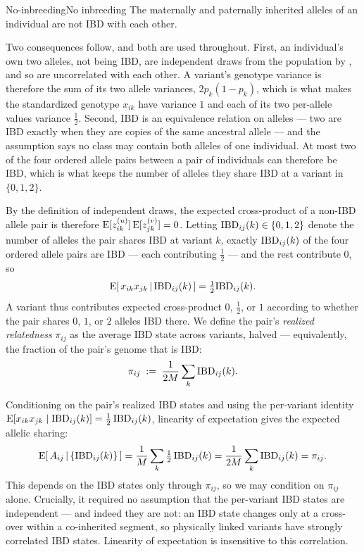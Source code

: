 \documentclass[12pt]{article}
\begin{document}
\begin{assumption}{No-inbreeding}{No inbreeding}
The maternally and paternally inherited alleles of an individual are not IBD with each other.
\end{assumption}

Two consequences follow, and both are used throughout.
First, an individual's own two alleles, not being IBD, are independent draws from the population by , and so are uncorrelated with each other.
A variant's genotype variance is therefore the sum of its two allele variances, $2p_k(1-p_k)$, which is what makes the standardized genotype $x_{ik}$ have variance $1$ and each of its two per-allele values variance $\tfrac12$.
Second, IBD is an equivalence relation on alleles --- two are IBD exactly when they are copies of the same ancestral allele --- and the assumption says no class may contain both alleles of one individual.
At most two of the four ordered allele pairs between a pair of individuals can therefore be IBD, which is what keeps the number of alleles they share IBD at a variant in $\{0,1,2\}$.

By the definition of independent draws, the expected cross-product of a non-IBD allele pair is therefore $\mathrm{E}[z^{(u)}_{ik}]\,\mathrm{E}[z^{(v)}_{jk}] = 0$.
Letting $\mathrm{IBD}_{ij}(k)\in\{0,1,2\}$ denote the number of alleles the pair shares IBD at variant $k$, exactly $\mathrm{IBD}_{ij}(k)$ of the four ordered allele pairs are IBD --- each contributing $\tfrac12$ --- and the rest contribute $0$, so
$$
    \mathrm{E}\!\left[\,x_{ik} x_{jk} \,\middle|\, \mathrm{IBD}_{ij}(k)\,\right]
    = \tfrac12 \mathrm{IBD}_{ij}(k) .
$$
A variant thus contributes expected cross-product $0$, $\tfrac12$, or $1$ according to whether the pair shares $0$, $1$, or $2$ alleles IBD there.
We define the pair's \emph{realized relatedness} $\pi_{ij}$ as the average IBD state across variants, halved --- equivalently, the fraction of the pair's genome that is IBD:
\begin{equation}\label{eq:pi-def}
    \pi_{ij} \;:=\; \frac{1}{2M}\sum_{k} \mathrm{IBD}_{ij}(k) .
\end{equation}

Conditioning on the pair's realized IBD states and using the per-variant identity $\mathrm{E}[x_{ik}x_{jk}\mid \mathrm{IBD}_{ij}(k)] = \tfrac12\,\mathrm{IBD}_{ij}(k)$, linearity of expectation gives the expected allelic sharing:
$$
    \mathrm{E}\!\left[\,A_{ij}\,\middle|\,\{\mathrm{IBD}_{ij}(k)\}\,\right]
    = \frac{1}{M}\sum_{k} \tfrac12\,\mathrm{IBD}_{ij}(k)
    = \frac{1}{2M}\sum_{k} \mathrm{IBD}_{ij}(k)
    = \pi_{ij} .
$$
This depends on the IBD states only through $\pi_{ij}$, so we may condition on $\pi_{ij}$ alone.
Crucially, it required no assumption that the per-variant IBD states are independent --- and indeed they are not: an IBD state changes only at a cross-over within a co-inherited segment, so physically linked variants have strongly correlated IBD states.
Linearity of expectation is insensitive to this correlation.
\end{document}

